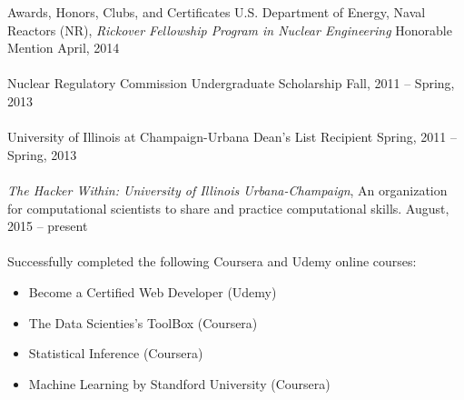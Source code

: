 \documentclass[10pt]{resume} %
\begin{document}
\begin{rSection}{Awards, Honors, Clubs, and Certificates}
U.S. Department of Energy, Naval Reactors (NR), {\it Rickover Fellowship Program in Nuclear Engineering} Honorable Mention \hfill{April, 2014} 
\\
\\
{ Nuclear Regulatory Commission Undergraduate Scholarship} \hfill{Fall, 2011 -- Spring, 2013}
\\
\\
University of Illinois at Champaign-Urbana Dean's List Recipient \hfill{Spring, 2011 -- Spring, 2013}
\\
\\
{\it{The Hacker Within: University of Illinois Urbana-Champaign}}, An organization for computational scientists to share and practice computational skills. \hspace{7.5cm}August, 2015 -- present
\\
\\
Successfully completed the following Coursera and Udemy online courses:
\begin{itemize}
	\item Become a Certified Web Developer (Udemy)
	\item The Data Scienties's ToolBox (Coursera)
	\item Statistical Inference (Coursera)
	\item Machine Learning by Standford University (Coursera)
\end{itemize}
\end{rSection}
\end{document}

